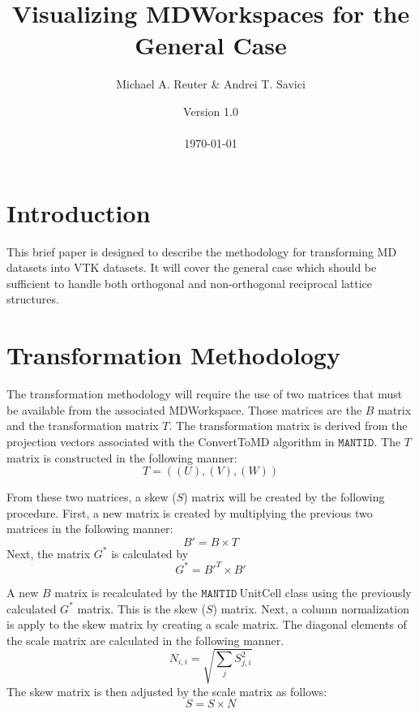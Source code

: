 \documentclass[11pt]{article}
\numberwithin{equation}{section}
\numberwithin{figure}{section}
\newcommand{\mantid}{\ensuremath{\mathtt{MANTID}}}
\begin{document}
\title{Visualizing MDWorkspaces for the General Case}
\author{Michael A. Reuter \& Andrei T. Savici}
\date{Version 1.0 \\ \ \\ \today}
\maketitle

\section{Introduction}

This brief paper is designed to describe the methodology for transforming MD datasets into VTK datasets. It will cover the general case which should be sufficient to handle both orthogonal and non-orthogonal reciprocal lattice structures.

\section{Transformation Methodology}

The transformation methodology will require the use of two matrices that must be available from the associated MDWorkspace. Those matrices are the $B$ matrix and the transformation matrix $T$. The transformation matrix is derived from the projection vectors associated with the ConvertToMD algorithm in \mantid. The $T$ matrix is constructed in the following manner:
\begin{equation}
T = ((U), (V), (W))
\end{equation}

From these two matrices, a skew ($S$) matrix will be created by the following procedure. First, a new matrix is created by multiplying the previous two matrices in the following manner:
\begin{equation}
B' = B \times T
\end{equation}
Next, the matrix $G^*$ is calculated by
\begin{equation}
G^* = B'^{T} \times B'
\end{equation}

A new $B$ matrix is recalculated by the \mantid$\ $UnitCell class using the previously calculated $G^*$ matrix. This is the skew ($S$) matrix. Next, a column normalization is apply to the skew matrix by creating a scale matrix. The diagonal elements of the scale matrix are calculated in the following manner.
\begin{equation}
N_{i,i} = \sqrt{\sum_j S_{j,i}^2}
\end{equation}
The skew matrix is then adjusted by the scale matrix as follows:
\begin{equation}
S = S \times N
\end{equation}
\end{document}
